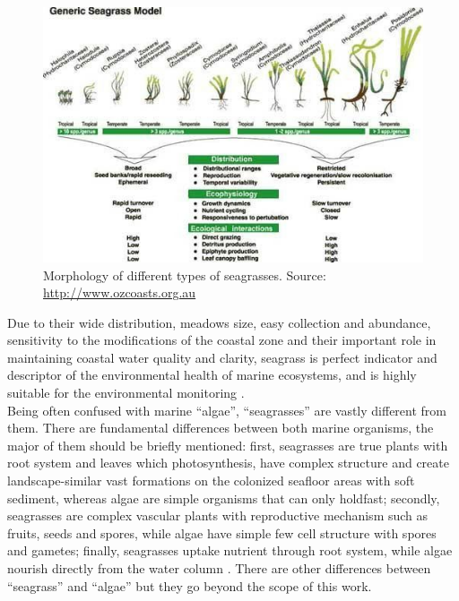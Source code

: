 \documentclass[11pt]{article}
\begin{document}
\begin{figure}
	\centering
	\includegraphics[scale=0.3]{Fig-1-3.jpg}
	\caption{Morphology of different types of seagrasses. Source: \url{http://www.ozcoasts.org.au}}
	\label{fig:3}
\end{figure}

Due to their wide distribution, meadows size, easy collection and abundance, sensitivity to the
modifications of the coastal zone and their important role in maintaining coastal water quality
and clarity, seagrass is perfect indicator and descriptor of the environmental health of marine
ecosystems, and is highly suitable for the environmental monitoring \cite{Pergent-Martini05}\label{Pergent-Martini05}.\\
Being often confused with marine “algae”, “seagrasses” are vastly different from them. There are
fundamental differences between both marine organisms, the major of them should be briefly
mentioned: first, seagrasses are true plants with root system and leaves which photosynthesis, have
complex structure and create landscape-similar vast formations on the colonized seafloor areas with
soft sediment, whereas algae are simple organisms that can only holdfast; secondly, seagrasses are
complex vascular plants with reproductive mechanism such as fruits, seeds and spores, while algae
have simple few cell structure with spores and gametes; finally, seagrasses uptake nutrient through
root system, while algae nourish directly from the water column \cite{Dixon05}\label{Dixon05}. There are other
differences between “seagrass” and “algae” but they go beyond the scope of this work.
\end{document}
